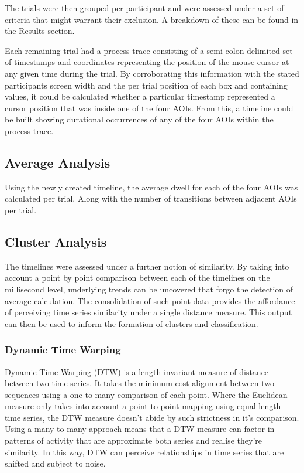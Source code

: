 \documentclass[man, floatsintext]{apa7}
\begin{document}
The trials were then grouped per participant and were assessed under a set of criteria that might warrant their exclusion. A breakdown of these can be found in the Results section.

Each remaining trial had a process trace consisting of a semi-colon delimited set of timestamps and coordinates representing the position of the mouse cursor at any given time during the trial.  By corroborating this information with the stated participants screen width and the per trial position of each box and containing values, it could be calculated whether a particular timestamp represented a cursor position that was inside one of the four AOIs. From this, a timeline could be built showing durational occurrences of any of the four AOIs within the process trace.

\subsection{Average Analysis}

Using the newly created timeline, the average dwell for each of the four AOIs was calculated per trial. Along with the number of transitions between adjacent AOIs per trial. 

\subsection{Cluster Analysis}

The timelines were assessed under a further notion of similarity. By taking into account a point by point comparison between each of the timelines on the millisecond level, underlying trends can be uncovered that forgo the detection of average calculation. The consolidation of such point data provides the affordance of perceiving time series similarity under a single distance measure. This output can then be used to inform the formation of clusters and classification.

\subsubsection{Dynamic Time Warping}

Dynamic Time Warping (DTW) is a length-invariant measure of distance between two time series. It takes the minimum cost alignment between two sequences using a one to many comparison of each point. Where the Euclidean measure only takes into account a point to point mapping using equal length time series, the DTW measure doesn't abide by such strictness in it's comparison. Using a many to many approach means that a DTW measure can factor in patterns of activity that are approximate both series and realise they're similarity. In this way, DTW can perceive relationships in time series that are shifted and subject to noise.
\end{document}
